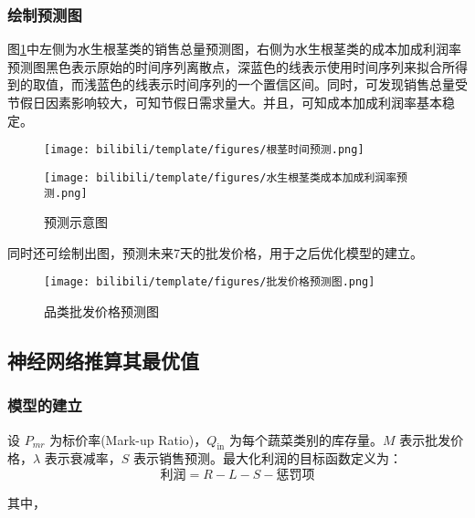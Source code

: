 \documentclass[withoutpreface,bwprint]{cumcmthesis} %
\begin{document}
\subsubsection{绘制预测图}
 图\ref{diaoduhou1}中左侧为水生根茎类的销售总量预测图，右侧为水生根茎类的成本加成利润率预测图黑色表示原始的时间序列离散点，深蓝色的线表示使用时间序列来拟合所得到的取值，而浅蓝色的线表示时间序列的一个置信区间。同时，可发现销售总量受节假日因素影响较大，可知节假日需求量大。并且，可知成本加成利润率基本稳定。
\begin{figure}[H]
	\caption{预测示意图}
	\label{diaoduhou1}
	\subfigure
	{
		\begin{minipage}[b]{.3\linewidth}
			\centering
			\texttt{[image: bilibili/template/figures/根茎时间预测.png]}
		\end{minipage}
	} \quad \quad \quad \quad\quad\quad
	\subfigure
	{
		\begin{minipage}[b]{.3\linewidth}
			\texttt{[image: bilibili/template/figures/水生根茎类成本加成利润率预测.png]}
   
		\end{minipage}
	}
 \end{figure}
同时还可绘制出图，预测未来7天的批发价格，用于之后优化模型的建立。
\begin{figure}[H]%
	\centering
	\texttt{[image: bilibili/template/figures/批发价格预测图.png]}%
    \caption{品类批发价格预测图}
    \label{批发}%
\end{figure}

\subsection{神经网络推算其最优值}
\subsubsection{模型的建立}
设 \( P_{mr} \) 为标价率(Mark-up Ratio)，\( Q_{\text{in}} \) 为每个蔬菜类别的库存量。\( M \) 表示批发价格，\( \lambda \) 表示衰减率，\( S \) 表示销售预测。最大化利润的目标函数定义为：
\begin{equation}
\text{利润} = R - L - S - \text{惩罚项}
\end{equation}

其中，
\end{document}
